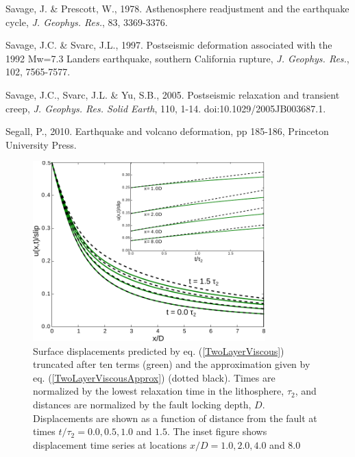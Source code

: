 \documentclass[extra,mreferee]{gji}
\begin{document}
\begin{thebibliography}{}
 Savage, J. \&
  Prescott, W., 1978. Asthenosphere readjustment and the earthquake
  cycle, \textit{J. Geophys. Res.}, 83, 3369-3376.

 Savage, J.C. \& Svarc, J.L.,
  1997. Postseismic deformation associated with the 1992 Mw=7.3
  Landers earthquake, southern California rupture,
  \textit{J. Geophys. Res.}, 102, 7565-7577.

 Savage, J.C., Svarc, J.L. \& Yu,
  S.B., 2005. Postseismic relaxation and transient creep,
  \textit{J. Geophys. Res. Solid Earth}, 110,
  1-14. doi:10.1029/2005JB003687.1.

 Segall, P., 2010. Earthquake and
  volcano deformation, pp 185-186, Princeton University Press.



\end{thebibliography}

\begin{figure}[h!]\label{figure1}
  \centering
  \includegraphics[width=0.8\textwidth]{FinalFigures/Figure1.pdf}
  \caption{Surface displacements predicted by
    eq. (\ref{TwoLayerViscous}) truncated after ten terms (green) and
    the approximation given by eq. (\ref{TwoLayerViscousApprox})
    (dotted black).  Times are normalized by the lowest relaxation
    time in the lithosphere, $\tau_2$, and distances are normalized by
    the fault locking depth, $D$.  Displacements are shown as a
    function of distance from the fault at times $t/\tau_2 =
    0.0,0.5,1.0$ and $1.5$. The inset figure shows displacement time
    series at locations $x/D = 1.0, 2.0, 4.0$ and $8.0$}
  \label{Figure 1}
\end{figure}
\end{document}
